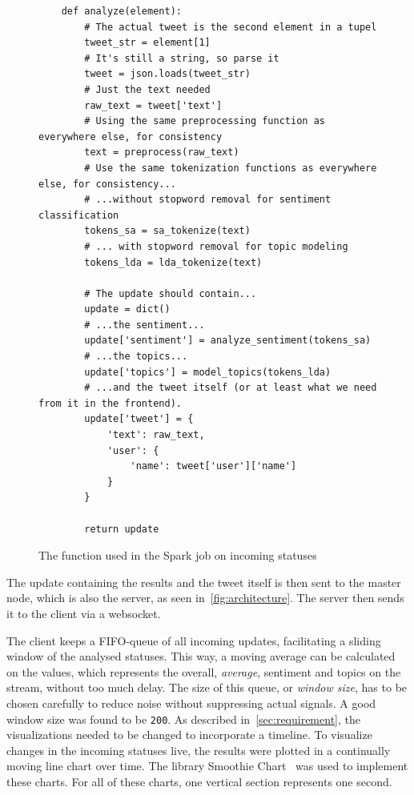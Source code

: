 \begin{figure}
    \caption{The function used in the Spark job on incoming statuses}
    \label{fig:spark_job}
    \begin{verbatim}
    def analyze(element):
        # The actual tweet is the second element in a tupel
        tweet_str = element[1]
        # It's still a string, so parse it
        tweet = json.loads(tweet_str)
        # Just the text needed
        raw_text = tweet['text']
        # Using the same preprocessing function as everywhere else, for consistency
        text = preprocess(raw_text)
        # Use the same tokenization functions as everywhere else, for consistency...
        # ...without stopword removal for sentiment classification
        tokens_sa = sa_tokenize(text)
        # ... with stopword removal for topic modeling
        tokens_lda = lda_tokenize(text)

        # The update should contain...
        update = dict()
        # ...the sentiment...
        update['sentiment'] = analyze_sentiment(tokens_sa)
        # ...the topics...
        update['topics'] = model_topics(tokens_lda)
        # ...and the tweet itself (or at least what we need from it in the frontend).
        update['tweet'] = {
            'text': raw_text,
            'user': {
                'name': tweet['user']['name']
            }
        }

        return update
    \end{verbatim}
\end{figure}

The update containing the results and the tweet itself is then sent to the master node,
which is also the server, as seen in~\ref{fig:architecture}.
The server then sends it to the client via a websocket.
\par
The client keeps a FIFO-queue of all incoming updates, facilitating a sliding window of the analysed statuses.
This way, a moving average can be calculated on the values, which represents the overall, \textit{average},
sentiment and topics on the stream, without too much delay.
The size of this queue, or \textit{window size}, has to be chosen carefully to reduce noise without suppressing actual signals.
A good window size was found to be \texttt{200}.
As described in~\ref{sec:requirement}, the visualizations needed to be changed to incorporate a timeline.
To visualize changes in the incoming statuses live, the results were plotted in a continually moving line chart over time.
The library Smoothie Chart~\cite{smoothieDocs} was used to implement these charts.
For all of these charts, one vertical section represents one second.

